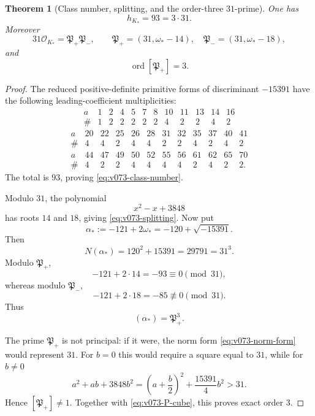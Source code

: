 \documentclass[11pt]{article}
\newtheorem{theorem}{Theorem}[section]
\theoremstyle{remark}
\begin{document}
\begin{theorem}[Class number, splitting, and the order-three \(31\)-prime]
\label{thm:v073-field-certificate}
One has
\begin{equation}
 \boxed{h_{K_*}=93=3\cdot31.}
 \label{eq:v073-class-number}
\end{equation}
Moreover
\begin{equation}
 \boxed{
 31\mathcal O_{K_*}
 =
 \mathfrak P_+\mathfrak P_-,
 \qquad
 \mathfrak P_+=(31,\omega_*-14),
 \quad
 \mathfrak P_-=(31,\omega_*-18),}
 \label{eq:v073-splitting}
\end{equation}
and
\begin{equation}
 \boxed{\operatorname{ord}[\mathfrak P_+]=3.}
 \label{eq:v073-P-order}
\end{equation}
\end{theorem}

\begin{proof}
The reduced positive-definite primitive forms of discriminant \(-15391\)
have the following leading-coefficient multiplicities:
\[
\begin{array}{c|rrrrrrrrrrr}
a&1&2&4&5&7&8&10&11&13&14&16\\ \hline
\#&1&2&2&2&2&2&4&2&2&4&2
\end{array}
\]
\[
\begin{array}{c|rrrrrrrrrrr}
a&20&22&25&26&28&31&32&35&37&40&41\\ \hline
\#&4&4&2&4&4&2&2&4&2&4&2
\end{array}
\]
\[
\begin{array}{c|rrrrrrrrrrr}
a&44&47&49&50&52&55&56&61&62&65&70\\ \hline
\#&4&2&2&4&4&4&4&2&4&2&2.
\end{array}
\]
The total is \(93\), proving \eqref{eq:v073-class-number}.

Modulo \(31\), the polynomial
\[
 x^2-x+3848
\]
has roots \(14\) and \(18\), giving \eqref{eq:v073-splitting}.
Now put
\begin{equation}
 \boxed{
 \alpha_*:=-121+2\omega_*
 =-120+\sqrt{-15391}.}
 \label{eq:v073-alpha}
\end{equation}
Then
\[
 N(\alpha_*)
 =120^2+15391
 =29791
 =31^3.
\]
Modulo \(\mathfrak P_+\),
\[
 -121+2\cdot14=-93\equiv0\pmod{31},
\]
whereas modulo \(\mathfrak P_-\),
\[
 -121+2\cdot18=-85\not\equiv0\pmod{31}.
\]
Thus
\begin{equation}
 \boxed{(\alpha_*)=\mathfrak P_+^3.}
 \label{eq:v073-P-cube}
\end{equation}

The prime \(\mathfrak P_+\) is not principal: if it were, the norm form
\eqref{eq:v073-norm-form} would represent \(31\).  For \(b=0\) this would
require a square equal to \(31\), while for \(b\ne0\)
\[
 a^2+ab+3848b^2
 =
 \left(a+\frac b2\right)^2+\frac{15391}{4}b^2
 >31.
\]
Hence \([\mathfrak P_+]\ne1\).  Together with
\eqref{eq:v073-P-cube}, this proves exact order \(3\).
\end{proof}
\end{document}
